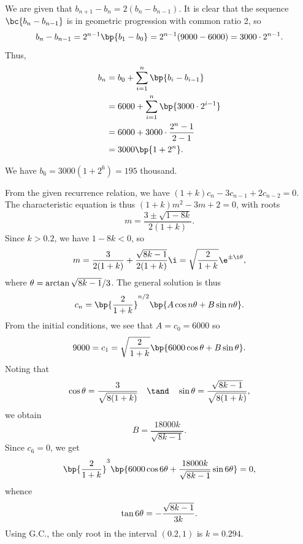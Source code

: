 \begin{solution}
    \begin{ppart}
        \begin{psubpart}
            We are given that $b_{n+1} - b_n = 2(b_n - b_{n-1})$. It is clear that the sequence $\bc{b_n - b_{n-1}}$ is in geometric progression with common ratio 2, so \[b_n - b_{n-1} = 2^{n-1} \bp{b_1 - b_0} = 2^{n-1} (9000 - 6000) = 3000 \cdot 2^{n-1}.\] Thus,
            \begin{align*}
                b_n &= b_0 + \sum_{i = 1}^{n} \bp{b_i - b_{i-1}}\\
                &= 6000 + \sum_{i = 1}^n \bp{3000 \cdot 2^{i-1}}\\
                &= 6000 + 3000 \cdot \frac{2^n - 1}{2-1}\\
                &= 3000 \bp{1 + 2^n}.
            \end{align*}
        \end{psubpart}
        \begin{psubpart}
            We have $b_6 = 3000(1 + 2^6) = 195$ thousand.
        \end{psubpart}
    \end{ppart}
    \begin{ppart}
        From the given recurrence relation, we have $(1+k) c_n - 3c_{n-1} + 2c_{n-2} = 0$. The characteristic equation is thus $(1+k)m^2 - 3m + 2 = 0$, with roots \[m = \frac{3 \pm \sqrt{1-8k}}{2(1+k)}.\] Since $k > 0.2$, we have $1 - 8k < 0$, so \[m = \frac3{2(1+k)} + \frac{\sqrt{8k-1}}{2(1+k)} \i = \sqrt{\frac2{1+k}} \e^{\pm \i \t},\] where $\theta = \arctan{\sqrt{8k-1}/3}$. The general solution is thus \[c_n = \bp{\frac2{1+k}}^{n/2} \bp{A \cos n\t + B \sin n\t}.\] From the initial conditions, we see that $A = c_0 = 6000$ so \[9000 = c_1 = \sqrt{\frac2{1+k}} \bp{6000 \cos \t + B \sin \t}.\] Noting that \[\cos \t = \frac{3}{\sqrt{8(1+k)}} \quad \tand \quad \sin \t = \frac{\sqrt{8k-1}}{\sqrt{8(1+k)}},\] we obtain \[B = \frac{18000k}{\sqrt{8k-1}}.\] Since $c_6 = 0$, we get \[\bp{\frac2{1+k}}^3 \bp{6000\cos 6\t + \frac{18000k}{\sqrt{8k-1}} \sin 6\t} = 0,\] whence \[\tan 6\theta = -\frac{\sqrt{8k-1}}{3k}.\] Using G.C., the only root in the interval $(0.2, 1)$ is $k = 0.294$.
    \end{ppart}
\end{solution}

